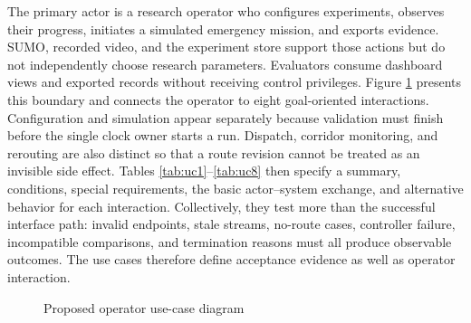 The primary actor is a research operator who configures experiments, observes their progress, initiates a simulated emergency mission, and exports evidence. SUMO, recorded video, and the experiment store support those actions but do not independently choose research parameters. Evaluators consume dashboard views and exported records without receiving control privileges. Figure \ref{fig:use-case} presents this boundary and connects the operator to eight goal-oriented interactions. Configuration and simulation appear separately because validation must finish before the single clock owner starts a run. Dispatch, corridor monitoring, and rerouting are also distinct so that a route revision cannot be treated as an invisible side effect. Tables \ref{tab:uc1}--\ref{tab:uc8} then specify a summary, conditions, special requirements, the basic actor--system exchange, and alternative behavior for each interaction. Collectively, they test more than the successful interface path: invalid endpoints, stale streams, no-route cases, controller failure, incompatible comparisons, and termination reasons must all produce observable outcomes. The use cases therefore define acceptance evidence as well as operator interaction.

\begin{figure}[htbp]
\centering
{}
\caption{Proposed operator use-case diagram}
\label{fig:use-case}
\end{figure}

